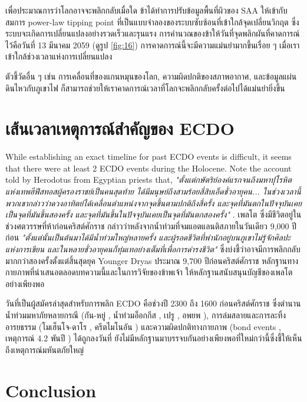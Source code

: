 \documentclass[10pt,twocolumn,letterpaper]{article}
\begin{document}
เพื่อประมาณการว่าโลกอาจจะพลิกกลับเมื่อใด ข้าได้ทำการปรับข้อมูลพื้นที่ผิวของ SAA ให้เข้ากับสมการ power-law tipping point ที่เป็นแบบจำลองของระบบซับซ้อนที่เข้าใกล้จุดเปลี่ยนวิกฤต ซึ่งระบบจะเกิดการเปลี่ยนแปลงอย่างรวดเร็วและรุนแรง การคำนวณของข้าให้วันที่จุดพลิกผันที่คาดการณ์ไว้คือวันที่ 13 มีนาคม 2059 (ดูรูป \ref{fig:16}) การคาดการณ์นี้จะมีความแม่นยำมากขึ้นเรื่อย ๆ เมื่อเราเข้าใกล้ช่วงเวลาแห่งการเปลี่ยนแปลง \cite{136}

ตัวชี้วัดอื่น ๆ เช่น การเคลื่อนที่ของแกนหมุนของโลก, ความผิดปกติของสภาพอากาศ, และข้อมูลแผ่นดินไหวกับภูเขาไฟ ก็สามารถช่วยให้เราคาดการณ์เวลาที่โลกจะพลิกกลับครั้งต่อไปได้แม่นยำยิ่งขึ้น

\section{เส้นเวลาเหตุการณ์สำคัญของ ECDO}
While establishing an exact timeline for past ECDO events is difficult, it seems that there were at least 2 ECDO events during the Holocene. Note the account told by Herodotus from Egyptian priests that, \textit{"ตั้งแต่กษัตริย์องค์แรกจนถึงมหาปุโรหิตแห่งเทพฮีฟีสทอสผู้ครองราชย์เป็นคนสุดท้าย ได้มีมนุษย์ถึงสามร้อยสี่สิบเอ็ดชั่วอายุคน... ในช่วงเวลานี้พวกเขากล่าวว่าดวงอาทิตย์ได้เคลื่อนตำแหน่งจากจุดขึ้นตามปกติถึงสี่ครั้ง และจุดที่มันตกในปัจจุบันเคยเป็นจุดที่มันขึ้นสองครั้ง และจุดที่มันขึ้นในปัจจุบันเคยเป็นจุดที่มันตกสองครั้ง"} \cite{32}. เพลโต ซึ่งมีชีวิตอยู่ในช่วงศตวรรษที่ห้าก่อนคริสต์ศักราช \cite{111} กล่าวว่าหลังจากน้ำท่วมที่จมแอตแลนติสภายในวันเดียว 9,000 ปีก่อน \textit{"ตั้งแต่นั้นเป็นต้นมาได้มีน้ำท่วมใหญ่หลายครั้ง และผู้รอดชีวิตที่พำนักอยู่บนภูเขาไม่รู้จักศิลปะแห่งการเขียน และในหลายชั่วอายุคนก็ทุ่มเทอย่างเต็มที่เพื่อการดำรงชีวิต"} \cite{112} ซึ่งบ่งชี้ว่าอาจมีการพลิกกลับมากกว่าสองครั้งตั้งแต่สิ้นสุดยุค Younger Dryas ประมาณ 9,700 ปีก่อนคริสต์ศักราช หลักฐานทางกายภาพที่นำเสนอตลอดบทความนี้และในการวิจัยของข้าพเจ้า \cite{2} ให้หลักฐานสนับสนุนบัญชีของเพลโตอย่างเพียงพอ

วันที่เป็นผู้สมัครล่าสุดสำหรับการพลิก ECDO คือช่วงปี 2300 ถึง 1600 ก่อนคริสต์ศักราช ซึ่งตำนานน้ำท่วมมหาภัยหลายกรณี (กัน-หยู่ \cite{113,114,115}, น้ำท่วมอ็อกกีส \cite{116,117}, เปรู \cite{118,119}, อพยพ \cite{120}), การล่มสลายและการละทิ้งอารยธรรม (โมเฮ็นโจ-ดาโร \cite{121}, ครีตไมโนอัน \cite{100,101}) และความผิดปกติทางกายภาพ (bond events \cite{122}, เหตุการณ์ 4.2 พันปี \cite{90}) ได้ถูกลงวันที่ ยังไม่มีหลักฐานมาบรรจบกันอย่างเพียงพอที่ใหม่กว่านี้ซึ่งชี้ให้เห็นถึงเหตุการณ์มหันตภัยใหญ่

\section{Conclusion}
\end{document}
